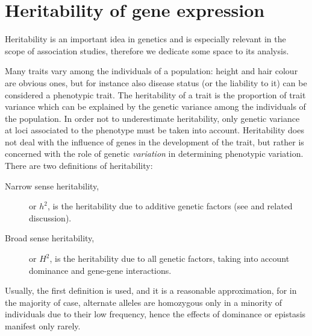 \documentclass[../main.tex]{subfiles}
\begin{document}
\section{Heritability of gene expression}

Heritability is an important idea in genetics and is especially relevant 
in the scope of association studies, therefore we dedicate some space to 
its analysis.

Many traits vary among the individuals of a population: height and hair 
colour are obvious ones, but for instance also disease status (or the 
liability to it) can be considered a phenotypic trait. The heritability 
of a trait is the proportion of trait variance which can be explained by 
the genetic variance among the individuals of the population. In order 
not to underestimate heritability, only genetic variance at loci 
associated to the phenotype must be taken into account. Heritability 
does not deal with the influence of genes in the development of the 
trait, but rather is concerned with the role of genetic 
\textit{variation} in determining phenotypic variation. There are two 
definitions of heritability:

\begin{description}
	\item[Narrow sense heritability,] or $h^2$, is the heritability due 
to additive genetic factors (see  and related 
discussion).
	\item[Broad sense heritability,] or $H^2$, is the heritability due 
to all genetic factors, taking into account dominance and gene-gene 
interactions.
\end{description}


Usually, the first definition is used, and it is a reasonable 
approximation, for in the majority of case, alternate alleles are 
homozygous only in a minority of individuals due to their low frequency, 
hence the effects of dominance or epistasis manifest only 
rarely\autocite{Visscher2008}.
\end{document}
